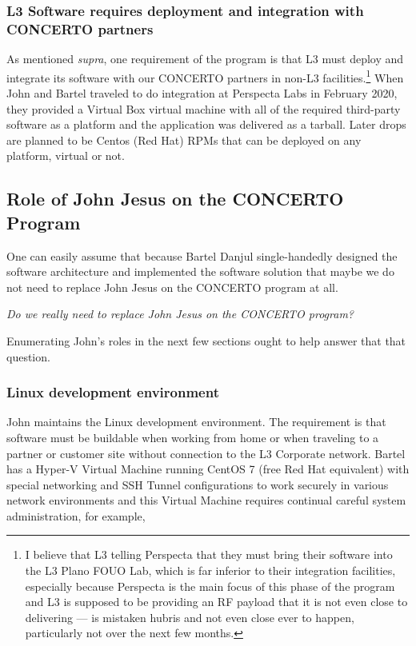 \documentclass[letterpaper,11pt]{texMemo} %
\begin{document}
\subsubsection*{L3 Software requires deployment and integration with CONCERTO partners}
As mentioned \emph{supra}, one requirement of the program is that L3 must deploy and integrate its software with our CONCERTO partners in non-L3 facilities.\footnote{I believe that L3 telling Perspecta that they must bring their software into the L3 Plano FOUO Lab, which is far inferior to their integration facilities, especially because Perspecta is the main focus of this phase of the program and L3 is supposed to be providing an RF payload that it is not even close to delivering --- is mistaken hubris and not even close ever to happen, particularly not over the next few months.}
When John and Bartel traveled to do integration at Perspecta Labs in February 2020, they provided a Virtual Box virtual machine with all of the required third-party software as a platform and the application was delivered as a tarball.
Later drops are planned to be Centos (Red Hat) RPMs that can be deployed on any platform, virtual or not.

\subsection*{Role of John Jesus on the CONCERTO Program}

One can easily assume that because Bartel Danjul single-handedly designed the software architecture and implemented the software solution that maybe we do not need to replace John Jesus on the CONCERTO program at all.\\

\centerline{\emph{Do we really need to replace John Jesus on the CONCERTO program?}}

\noindent
Enumerating John's roles in the next few sections ought to help answer that that question.

\subsubsection*{Linux development environment}
John maintains the Linux development environment.  The requirement is that software must be buildable when working from home or when traveling to a partner or customer site without connection to the L3 Corporate network.  Bartel has a Hyper-V Virtual Machine running CentOS 7 (free Red Hat equivalent) with special networking and SSH Tunnel configurations to work securely in various network environments and this Virtual Machine requires continual careful system administration, for example,
\end{document}
